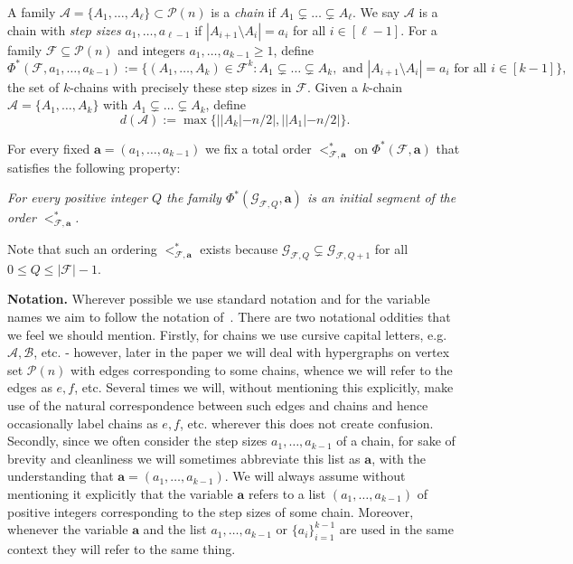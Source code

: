 \documentclass[12pt]{article}
\numberwithin{equation}{section}
\def\A{\mathcal{A}}
\def\B{\mathcal{B}}
\def\F{\mathcal{F}}
\def\G{\mathcal{G}}
\def\P{\mathcal{P}}
\begin{document}
A family $\A=\{A_1,\ldots,A_{\ell}\}\subset \P(n)$ is a \emph{chain} if $A_1\subsetneq \ldots \subsetneq A_{\ell}$. We say $\A$ is a chain with \emph{step sizes} $a_1,\ldots,a_{\ell -1}$ if $|A_{i+1}\setminus A_i|=a_i$ for all $i\in [\ell-1]$.  For a family $\F\subseteq \P(n)$  and integers $a_1,\ldots,a_{k-1}\geq 1$, define 
$$\Phi^*(\F,a_1,\ldots,a_{k-1}):=\{(A_1,\ldots,A_k)\in\F^k: A_1\subsetneq \ldots \subsetneq A_k, \text{ and } |A_{i+1}\setminus A_i|= a_i \text{ for all } i\in [k-1]\},$$ the set of $k$-chains with precisely these step sizes in $\F$. Given a $k$-chain $\A=\{A_1,\ldots,A_k\}$ with $A_1\subsetneq\ldots\subsetneq A_k$, define
$$d(\A):=\max\{||A_k|-n/2|, ||A_1|-n/2|\}.$$ 



For every fixed $\mathbf{a}=(a_1,\ldots,a_{k-1})$ we fix a total order $<^*_{\F,\mathbf{a}}$ on $\Phi^*(\F,\mathbf{a})$ that satisfies the following property:

\vspace{.2in}

\emph{For every positive integer $Q$ the family $\Phi^*(\G_{\F,Q},\mathbf{a})$ is an initial segment of the order $<^*_{\F,\mathbf{a}}$.}

\vspace{.2in}

Note that such an ordering $<^*_{\F,\mathbf{a}}$ exists because $\G_{\F,Q}\subsetneq \G_{\F,Q+1}$ for all $0\leq Q\leq |\F|-1$.

\textbf{Notation.} Wherever possible we use standard notation and for the variable names we aim to follow the notation of~\cite{dasgansuda}. There are two notational oddities that we feel we should mention. Firstly, for chains we use cursive capital letters, e.g. $\A,\B$, etc. - however, later in the paper we will deal with hypergraphs on vertex set $\P(n)$ with edges corresponding to some chains, whence we will refer to the edges as $e,f$, etc. Several times we will, without mentioning this explicitly, make use of the natural correspondence between such edges and chains and hence occasionally label chains as $e,f$, etc. wherever this does not create confusion. Secondly, since we often consider the step sizes  $a_1,\ldots,a_{k-1}$ of a chain, for sake of brevity and cleanliness we will sometimes abbreviate this list as $\mathbf{a}$, with the understanding that $\mathbf{a}=(a_1,\ldots,a_{k-1})$. We will always assume without mentioning it explicitly that the variable $\mathbf{a}$ refers to a list $(a_1,\ldots,a_{k-1})$ of positive integers corresponding to the step sizes of some chain. Moreover, whenever the variable $\mathbf{a}$ and the list $a_1,\ldots,a_{k-1}$ or $\{a_i\}_{i=1}^{k-1}$ are used in the same context they will refer to the same thing.
\end{document}
